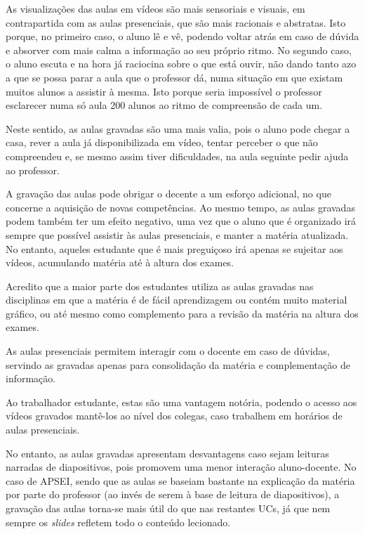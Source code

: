 \documentclass[portuguese, 11pt, a4paper, titlepage, oneside]{article}
\begin{document}
As visualizações das aulas em vídeos são mais sensoriais e visuais, em contrapartida com as aulas presenciais, que são mais racionais e abstratas. Isto porque, no primeiro caso, o aluno lê e vê, podendo voltar atrás em caso de dúvida e absorver com mais calma a informação ao seu próprio ritmo. No segundo caso, o aluno escuta e na hora já raciocina sobre o que está ouvir, não dando tanto azo a que se possa parar a aula que o professor dá, numa situação em que existam muitos alunos a assistir à mesma. Isto porque seria impossível o professor esclarecer numa só aula 200 alunos ao ritmo de compreensão de cada um.

Neste sentido, as aulas gravadas são uma mais valia, pois o aluno pode chegar a casa, rever a aula já disponibilizada em vídeo, tentar perceber o que não compreendeu e, se mesmo assim tiver dificuldades, na aula seguinte pedir ajuda ao professor.

A gravação das aulas pode obrigar o decente a um esforço adicional, no que concerne a aquisição de novas competências. Ao mesmo tempo, as aulas gravadas podem também ter um efeito negativo, uma vez que o aluno que é organizado irá sempre que possível assistir às aulas presenciais, e manter a matéria atualizada. No entanto, aqueles estudante que é mais preguiçoso irá apenas se sujeitar aos vídeos, acumulando matéria até à altura dos exames.

Acredito que a maior parte dos estudantes utiliza as aulas gravadas nas disciplinas em que a matéria é de fácil aprendizagem ou contém muito material gráfico, ou até mesmo como complemento para a revisão da matéria na altura dos exames.

As aulas presenciais permitem interagir com o docente em caso de dúvidas, servindo as gravadas apenas para consolidação da matéria e complementação de informação.

Ao trabalhador estudante, estas são uma vantagem notória, podendo o acesso aos vídeos gravados mantê-los ao nível dos colegas, caso trabalhem em horários de aulas presenciais.

No entanto, as aulas gravadas apresentam desvantagens caso sejam leituras narradas de diapositivos, pois promovem uma menor interação aluno-docente. No caso de APSEI, sendo que as aulas se baseiam bastante na explicação da matéria por parte do professor (ao invés de serem à base de leitura de diapositivos), a gravação das aulas torna-se mais útil do que nas restantes UCs, já que nem sempre os \textit{slides} refletem todo o conteúdo lecionado.
\end{document}
